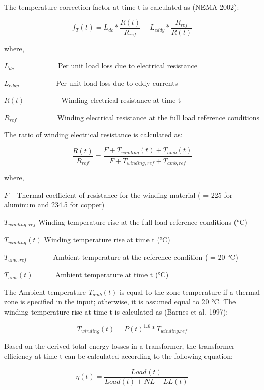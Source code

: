 The temperature correction factor at time t is calculated as (NEMA 2002):

\begin{equation}
{f_T}(t) = {L_{dc}}*\frac{{R(t)}}{{{R_{ref}}}} + {L_{eddy}}*\frac{{{R_{ref}}}}{{R(t)}}
\end{equation}

where,

\({L_{dc}}\) ~~~~~~~~~~~ Per unit load loss due to electrical resistance

\({L_{eddy}}\) ~~~~~~~~~ Per unit load loss due to eddy currents

\(R(t)\) ~~~~~~~~~ Winding electrical resistance at time t

\({R_{ref}}\) ~~~~~~~~~~ Winding electrical resistance at the full load reference conditions

The ratio of winding electrical resistance is calculated as:

\begin{equation}
\frac{{R(t)}}{{{R_{ref}}}} = \frac{{F + {T_{winding}}(t) + {T_{amb}}(t)}}{{F + {T_{winding,ref}} + {T_{amb,ref}}}}
\end{equation}

where,

\(F\) ~ Thermal coefficient of resistance for the winding material ( = 225 for aluminum and 234.5 for copper)

\({T_{winding,ref}}\) Winding temperature rise at the full load reference conditions (°C)

\({T_{winding}}(t)\) Winding temperature rise at time t (°C)

\({T_{amb,ref}}\) ~~~~~~ Ambient temperature at the reference condition ( = 20 °C)

\({T_{amb}}(t)\) ~~~~~ Ambient temperature at time t (°C)

The Ambient temperature \({T_{amb}}(t)\) is equal to the zone temperature if a thermal zone is specified in the input; otherwise, it is assumed equal to 20 °C. The winding temperature rise at time t is calculated as (Barnes et al. 1997):

\begin{equation}
{T_{winding}}(t) = P{(t)^{1.6}}*{T_{winding.ref}}
\end{equation}

Based on the derived total energy losses in a transformer, the transformer efficiency at time t can be calculated according to the following equation:

\begin{equation}
\eta (t) = \frac{{Load(t)}}{{Load(t) + NL + LL(t)}}
\end{equation}

